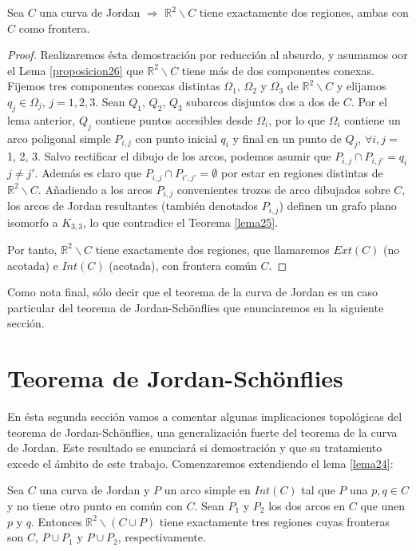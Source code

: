 \documentclass[12pt,a4paper,oldfontcommands]{memoir}
\begin{document}
\begin{theorem}
	Sea $C$ una curva de Jordan $\Rightarrow$ $\mathbb{R}^2 \backslash C$ tiene exactamente dos regiones, ambas con $C$ como frontera.
\end{theorem}

\begin{proof}
Realizaremos ésta demostración por reducción al absurdo, y asumamos oor el Lema \ref{proposicion26}  que $\mathbb{R}^2 \backslash C$ tiene más de dos componentes conexas. Fijemos  tres componentes conexas distintas $\Omega_1$, $\Omega_2$ y $\Omega_3$ de $\mathbb{R}^2 \backslash C$ y elijamos $q_j\in \Omega_j$, $j=1,2,3$.
Sean $Q_1$, $Q_2$, $Q_3$ subarcos disjuntos dos a dos de $C$. 	 Por el lema anterior, $Q_j$ contiene puntos accesibles desde $\Omega_i$, por lo que $\Omega_i$ contiene un arco poligonal simple $P_{i,j}$ con punto inicial $q_i$ y final en un punto de $Q_j$,  $\forall i,j =$ 1, 2, 3. Salvo rectificar el dibujo de los arcos, podemos asumir que $P_{i,j} \cap P_{i,j'} = {q_i}$ $j \neq j'$. Además es claro que $P_{i,j} \cap P_{i',j'} = \emptyset$ por estar en regiones distintas de $\mathbb{R}^2 \backslash C$.
Añadiendo a los arcos $P_{i,j}$ convenientes trozos de arco  dibujados sobre $C$,  los arcos de Jordan resultantes (también denotados $P_{i,j}$) definen un grafo plano isomorfo a $K_{3,3}$, lo que contradice el Teorema \ref{lema25}.

Por tanto, $\mathbb{R}^2 \backslash C$ tiene exactamente dos regiones,  que llamaremos  $Ext(C)$ (no acotada) e $Int(C)$ (acotada), con frontera común $C$.
\end{proof}

Como nota final, sólo decir que el teorema de la curva de Jordan es un caso particular del teorema de Jordan-Schönflies que enunciaremos en la siguiente sección.

\section{Teorema de Jordan-Schönflies}

En ésta segunda sección vamos a comentar algunas implicaciones topológicas del teorema de Jordan-Schönflies, una generalización fuerte del teorema de la curva de Jordan. Este resultado  se enunciará si demostración y que su tratamiento excede el ámbito de este trabajo. 
Comenzaremos extendiendo el lema \ref{lema24}:

\begin{lemma}
	Sea $C$ una curva de Jordan y $P$ un arco   simple en $Int(C)$ tal que $P$ una $p,q \in C$ y no tiene otro punto en común con $C$. Sean $P_1$ y $P_2$ los dos arcos en $C$ que unen $p$ y $q$. Entonces $\mathbb{R}^2 \backslash (C \cup P)$ tiene exactamente tres regiones cuyas fronteras son $C$, $P\cup P_1$ y $P\cup P_2$, respectivamente.
\end{lemma}
\end{document}
